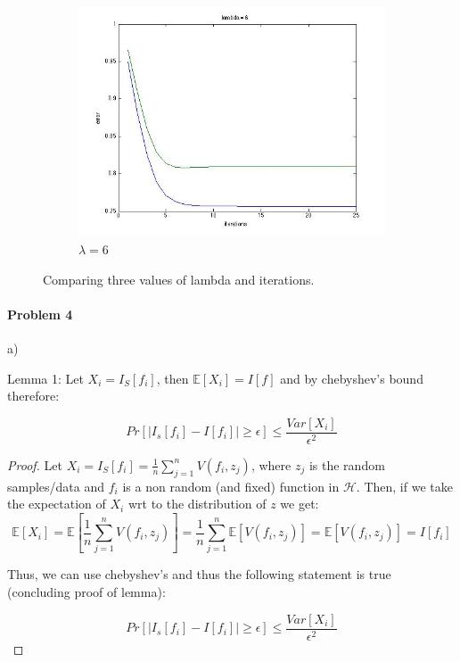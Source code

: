 \documentclass[12pt]{report}
\begin{document}
\begin{figure}
\begin{subfigure}[b]{0.3\textwidth}
        \centering
        \includegraphics[width=\textwidth]{l6.jpg}
        \caption{$\lambda = 6$}
        \label{fig:five over x}
    \end{subfigure}
    \caption{Comparing three values of lambda and iterations.}
    \label{fig:3d}
\end{figure}

\paragraph{Problem 4}
a)


Lemma 1: Let $X_i = I_S[f_i]$, then $\mathbb{E}[X_i] = I[f]$ and by chebyshev's bound therefore:

$$ Pr[ | I_s[f_i] - I[f_i] | \geq \epsilon ] \leq \frac{ Var[X_i] }{ \epsilon^2 } $$

\begin{proof}
Let $X_i = I_S[f_i] = \frac{1}{n} \sum^{n}_{j=1} V(f_i, z_j)$, where $z_j$ is the random samples/data and $f_i$ is a non random (and fixed) function in $\mathcal{H}$. Then, if we take the expectation of $X_i$ wrt to the distribution of $z$ we get:
$$\mathbb{E}[X_i]  = \mathbb{E}[\frac{1}{n} \sum^{n}_{j=1} V(f_i, z_j)] = \frac{1}{n} \sum^{n}_{j=1} \mathbb{E}[V(f_i, z_j)] =  \mathbb{E}[V(f_i, z_j)] = I[f_i]$$

Thus, we can use chebyshev's and thus the following statement is true (concluding proof of lemma):

$$ Pr[ | I_s[f_i] - I[f_i] | \geq \epsilon ] \leq \frac{ Var[X_i] }{ \epsilon^2 } $$

\end{proof}
\end{document}
